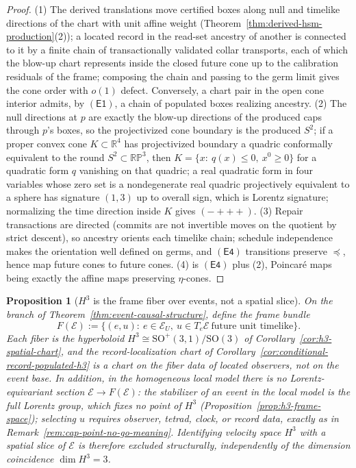 \documentclass[11pt]{article}
\newtheorem{proposition}[theorem]{Proposition}
\begin{document}
\begin{proof}
(1) The derived translations move certified boxes along null and timelike
directions of the chart with unit affine weight
(Theorem~\ref{thm:derived-hsm-production}(2)); a located record in the
read-set ancestry of another is connected to it by a finite chain of
transactionally validated collar transports, each of which the blow-up chart
represents inside the closed future cone up to the calibration residuals of
the frame; composing the chain and passing to the germ limit gives the cone
order with \(o(1)\) defect. Conversely, a chart pair in the open cone
interior admits, by \(\mathsf{(E1)}\), a chain of populated boxes realizing
ancestry. (2) The null directions at \(p\) are exactly the blow-up directions
of the produced caps through \(p\)'s boxes, so the projectivized cone boundary
is the produced \(S^2\); if a proper convex cone \(K\subset\mathbb R^4\) has
projectivized boundary a quadric conformally equivalent to the round
\(S^2\subset\mathbb{RP}^3\), then \(K=\{x:\ q(x)\leq0,\ x^0\geq0\}\) for a
quadratic form \(q\) vanishing on that quadric; a real quadratic form in four
variables whose zero set is a nondegenerate real quadric projectively
equivalent to a sphere has signature \((1,3)\) up to overall sign, which is
Lorentz signature; normalizing the time direction inside \(K\) gives
\((-{+}{+}{+})\). (3) Repair transactions are directed (commits are not
invertible moves on the quotient by strict descent), so ancestry orients each
timelike chain; schedule independence makes the orientation well defined on
germs, and \(\mathsf{(E4)}\) transitions preserve \(\preceq\), hence map
future cones to future cones. (4) is \(\mathsf{(E4)}\) plus (2), Poincar\'e
maps being exactly the affine maps preserving \(\eta\)-cones.
\end{proof}

\begin{proposition}[\(H^3\) is the frame fiber over events, not a spatial slice]
\label{prop:h3-fiber-not-slice}
On the branch of Theorem~\ref{thm:event-causal-structure}, define the frame
bundle
\[
F(\mathcal E):=\bigl\{(e,u):\ e\in\mathcal E_U,\
u\in T_e\mathcal E\ \text{future unit timelike}\bigr\}.
\]
Each fiber is the hyperboloid \(H^3\cong\mathrm{SO}^{+}(3,1)/\mathrm{SO}(3)\)
of Corollary~\ref{cor:h3-spatial-chart}, and the record-localization chart of
Corollary~\ref{cor:conditional-record-populated-h3} is a chart on the
\emph{fiber} data of located observers, not on the event base. In addition, in
the homogeneous local model there is no Lorentz-equivariant section
\(\mathcal E\to F(\mathcal E)\): the stabilizer of an event in the local model
is the full Lorentz group, which fixes no point of \(H^3\)
(Proposition~\ref{prop:h3-frame-space}); selecting \(u\) requires observer,
tetrad, clock, or record data, exactly as in
Remark~\ref{rem:cap-point-no-go-meaning}. Identifying velocity space
\(H^3\) with a spatial slice of \(\mathcal E\) is therefore excluded
structurally, independently of the dimension coincidence
\(\dim H^3=3\).
\end{proposition}
\end{document}
